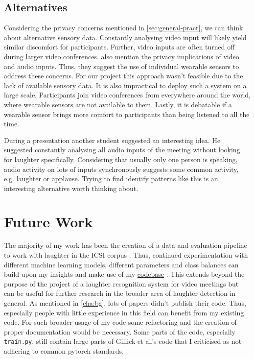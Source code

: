 \documentclass[bsc,frontabs,parskip,deptreport]{infthesis}
\newcommand{\coderepo}{\href{https://github.com/LasseWolter/laughter-detection-icsi}{codebase} }
\begin{document}
\section{Alternatives}
Considering the privacy concerns mentioned in \autoref{sec:general-pract}, we can think about alternative sensory data. 
Constantly analysing video input will likely yield similar discomfort for participants. Further, video inputs are often turned off during larger video conferences.
\citeauthor{cosentino2016quantitative}  also mention the privacy implications of video and audio inputs.
Thus, they suggest the use of individual wearable sensors to address these concerns. For our project this approach wasn't feasible due to the lack of available sensory data.
It is also impractical to deploy such a system on a large scale. Participants join video conferences from everywhere around the world, where wearable sensors are not available to them. Lastly, it is debatable if a wearable sensor brings more comfort to participants than being listened to all the time. 

During a presentation another student suggested an interesting idea. He suggested constantly analysing all audio inputs of the meeting without looking for laughter specifically. Considering that usually only one person is speaking, audio activity on lots of inputs synchronously suggests some common activity, e.g. laughter or applause. Trying to find identify patterns like this is an interesting alternative worth thinking about. 

\chapter{Future Work}
The majority of my work has been the creation of a data and evaluation pipeline to work with laughter in the ICSI corpus \citep{morgan2001meeting}. 
Thus, continued experimentation with different machine learning models, different parameters and class balances can build upon my insights and make use of my \coderepo.
This extends beyond the purpose of the project of a laughter recognition system for video meetings but can be useful for further research in the broader area of laughter detection in general. 
As mentioned in \autoref{cha:bg}, lots of papers didn't publish their code.
Thus, especially people with little experience in this field can benefit from my existing code. 
For such broader usage of my code some refactoring and the creation of proper documentation would be necessary.
Some parts of the code, especially \verb|train.py|, still contain large parts of Gillick et al.'s code that I criticised as not adhering to common pytorch standards. 
\end{document}
